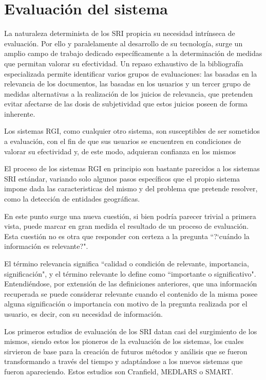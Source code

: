 \section{Evaluación del sistema}\label{sec:eval}

La naturaleza determinista de los SRI propicia su necesidad intrínseca de
evaluación. Por ello y paralelamente al desarrollo de su tecnología, surge un
amplio campo de trabajo dedicado específicamente a la determinación de medidas
que permitan valorar su efectividad. Un repaso exhaustivo de la bibliografía
especializada permite identificar varios grupos de evaluaciones: las basadas
en la relevancia de los documentos, las basadas en los usuarios y un tercer
grupo de medidas alternativas a la realización de los juicios de relevancia,
que pretenden evitar afectarse de las dosis de subjetividad que estos juicios
poseen de forma inherente.

Los sistemas RGI, como cualquier otro sistema, son susceptibles de ser
sometidos a evaluación, con el fin de que sus usuarios se encuentren en
condiciones de valorar su efectividad y, de este modo, adquieran confianza
en los mismos

El proceso de los sistemas RGI en principio son bastante parecidos a los 
sistemas SRI estándar, variando solo algunos pasos específicos que el propio
sistema impone dada las caracteristicas del mismo y del problema que pretende
resolver, como la detección de entidades geográficas. \cite{Kornai2005}

En este punto surge una nueva cuestión, si bien podría parecer trivial a
primera vista, puede marcar en gran medida el resultado de un proceso de
evaluación. Esta cuestión no es otra que responder con certeza a la pregunta
``?`cuándo la información es relevante?".

El término relevancia significa ``calidad o condición de relevante,
importancia, significación", y el término relevante lo define como
``importante o significativo". Entendiéndose, por extensión de las definiciones
anteriores, que una información recuperada se puede considerar relevante
cuando el contenido de la misma posee alguna significación o importancia
con motivo de la pregunta realizada por el usuario, es decir, con su
necesidad de información.

Los primeros estudios de evaluación de los SRI datan casi del surgimiento de
los mismos, siendo estos los pioneros de la evaluación de los sistemas, los
cuales sirvieron de base para la creación de futuros métodos y análisis que
se fueron transformando a través del tiempo y adaptándose a los nuevos
sistemas que fueron apareciendo. Estos estudios son Cranfield,
MEDLARS o SMART. \cite{bors2000}

